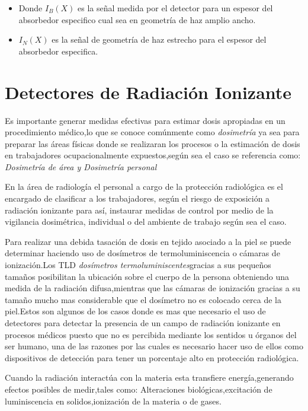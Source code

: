 \documentclass[12pt,fleqn]{book} %
\numberwithin{equation}{section} %
\numberwithin{figure}{section} %
\numberwithin{table}{section} %
\begin{document}
{\begin{itemize}
\begin{itemize}
\item  Donde ${I_{B}(X)}$ es la señal medida por el detector para un espesor del absorbedor especifico cual sea en geometría de haz amplio ancho.
 \item ${I_{N}(X)}$ 
 es la señal de geometría de haz estrecho para el espesor del absorbedor especifica. \end{itemize}
\end{itemize}


\section {Detectores de Radiación Ionizante}

Es importante generar  medidas efectivas para estimar  dosis apropiadas en un procedimiento médico,lo que se conoce comúnmente como \textit {dosimetría} ya sea para preparar las áreas físicas donde se realizaran los procesos o la estimación de dosis en trabajadores ocupacionalmente expuestos,según sea el caso se referencia como: \textit{Dosimetría de área y Dosimetría personal}

En la área de radiología el personal a cargo de la protección radiológica es el encargado de clasificar a los trabajadores, según el riesgo de exposición a radiación ionizante para así,
instaurar medidas de control por medio de la vigilancia dosimétrica, individual o del ambiente de trabajo según sea el caso.

Para realizar una debida tasación de dosis en tejido asociado a la piel se puede determinar haciendo uso de dosímetros de termoluminiscencia o cámaras de ionización.Los TLD \textit{dosímetros termoluminiscentes}gracias a sus pequeños tamaños posibilitan la ubicación sobre el cuerpo de la persona obteniendo una medida de la radiación difusa,mientras que las cámaras de ionización gracias a su tamaño mucho mas considerable que el dosímetro no es colocado cerca de la piel.Estos son algunos de los casos donde es mas que necesario el uso de detectores para detectar la presencia de
un campo de radiación ionizante en procesos médicos puesto que no es percibida mediante los sentidos u órganos del ser humano, una de las razones por las cuales es necesario hacer uso de ellos como dispositivos de detección para tener un porcentaje alto en protección radiológica.
 
Cuando la radiación interactúa con la  materia esta transfiere energía,generando efectos posibles de medir,tales como: Alteraciones biológicas,excitación de luminiscencia en solidos,ionización de la materia o de gases.



}
\end{document}
